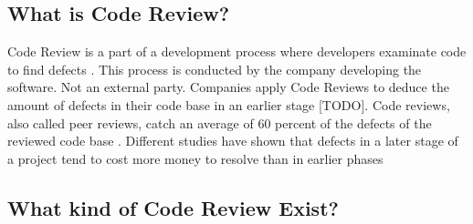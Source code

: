 \subsection*{What is Code Review?}

Code Review is a part of a development process where developers examinate code to find defects \autocite[47]{10.1109/MS.2003.1241366}.
This process is conducted by the company developing the software. Not an external party.
Companies apply Code Reviews to deduce the amount of defects in their code base in an earlier stage [TODO].
Code reviews, also called peer reviews, catch an average of 60 percent of the defects of the reviewed code base \autocite[136]{10.1109/2.962984}.
Different studies have shown that defects in a later stage of a project tend to cost more money to resolve than in earlier phases \autocite[135]{10.1109/2.962984} \autocite[21]{beck2000extreme}

\subsection*{What kind of Code Review Exist?}


